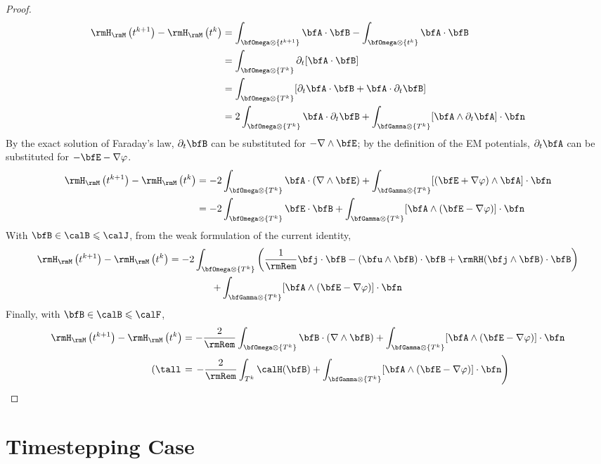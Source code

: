         \begin{proof}
            \begin{align}
                \rmH_{\rmM}\left(t^{k + 1}\right) - \rmH_{\rmM}\left(t^{k}\right)  &=  \int_{\bfOmega\otimes\left\{t^{k + 1}\right\}}\bfA\cdot\bfB - \int_{\bfOmega\otimes\left\{t^{k}\right\}}\bfA\cdot\bfB  \\
                &=  \int_{\bfOmega\otimes\left\{T^{k}\right\}}\partial_{t}[\bfA\cdot\bfB]  \\
                &=  \int_{\bfOmega\otimes\left\{T^{k}\right\}}[\partial_{t}\bfA\cdot\bfB + \bfA\cdot\partial_{t}\bfB]  \\
                &=  2\int_{\bfOmega\otimes\left\{T^{k}\right\}}\bfA\cdot\partial_{t}\bfB + \int_{\bfGamma\otimes\left\{T^{k}\right\}}[\bfA\wedge\partial_{t}\bfA]\cdot\bfn
            \end{align}
            By the exact solution of Faraday's law, $\partial_{t}\bfB$ can be substituted for $- \nabla\wedge\bfE$; by the definition of the EM potentials, $\partial_{t}\bfA$ can be substituted for $- \bfE - \nabla\varphi$.
            \begin{align}
                \rmH_{\rmM}\left(t^{k + 1}\right) - \rmH_{\rmM}\left(t^{k}\right)  &=  - 2\int_{\bfOmega\otimes\left\{T^{k}\right\}}\bfA\cdot(\nabla\wedge\bfE) + \int_{\bfGamma\otimes\left\{T^{k}\right\}}[(\bfE + \nabla\varphi)\wedge\bfA]\cdot\bfn  \\
                &=  - 2\int_{\bfOmega\otimes\left\{T^{k}\right\}}\bfE\cdot\bfB + \int_{\bfGamma\otimes\left\{T^{k}\right\}}[\bfA\wedge(\bfE - \nabla\varphi)]\cdot\bfn
            \end{align}
            With $\bfB  \in  \calB  \leqslant  \calJ$, from the weak formulation of the current identity,
            \begin{multline}
                \rmH_{\rmM}\left(t^{k + 1}\right) - \rmH_{\rmM}\left(t^{k}\right)  =  - 2\int_{\bfOmega\otimes\left\{T^{k}\right\}}\left(\frac{1}{\rmRem}\bfj\cdot\bfB - (\bfu\wedge\bfB)\cdot\bfB + \rmRH(\bfj\wedge\bfB)\cdot\bfB\right)  \\
                + \int_{\bfGamma\otimes\left\{T^{k}\right\}}[\bfA\wedge(\bfE - \nabla\varphi)]\cdot\bfn
            \end{multline}
            Finally, with $\bfB  \in  \calB  \leqslant  \calF$,
            \begin{align}
                \rmH_{\rmM}\left(t^{k + 1}\right) - \rmH_{\rmM}\left(t^{k}\right)  &=  - \frac{2}{\rmRem}\int_{\bfOmega\otimes\left\{T^{k}\right\}}\bfB\cdot(\nabla\wedge\bfB) + \int_{\bfGamma\otimes\left\{T^{k}\right\}}[\bfA\wedge(\bfE - \nabla\varphi)]\cdot\bfn  \\
                \left(\tall\right.&=  \left.- \frac{2}{\rmRem}\int_{T^{k}}\calH(\bfB) + \int_{\bfGamma\otimes\left\{T^{k}\right\}}[\bfA\wedge(\bfE - \nabla\varphi)]\cdot\bfn\right)
            \end{align}
        \end{proof}

        
    \section*{Timestepping Case}
